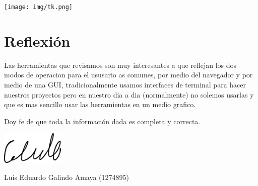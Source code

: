 \documentclass[12pt]{article}
\begin{document}
\begin{center}
\texttt{[image: img/tk.png]}
\end{center}


\section*{Reflexión}
\label{sec:org74dd750}
\begin{mdframed}
Las herramientas que revisamos son muy interesantes a que reflejan los dos modos de operacion para el ususario as comunes, por medio del navegador y por medio de una GUI, tradicionalmente usamos interfaces de terminal para hacer nuestros proyectos pero en nuestro dia a dia (normalmente) no solemos usarlas y que es mas sencillo usar las herramientas en un medio grafico. 
\end{mdframed}

\begin{center}
Doy fe de que toda la información dada es  completa y correcta. \\
\begin{center}
\includegraphics[width=3cm]{../includes/firma.png}
\end{center}
Luis Eduardo Galindo Amaya (1274895)
\end{center}
\end{document}
